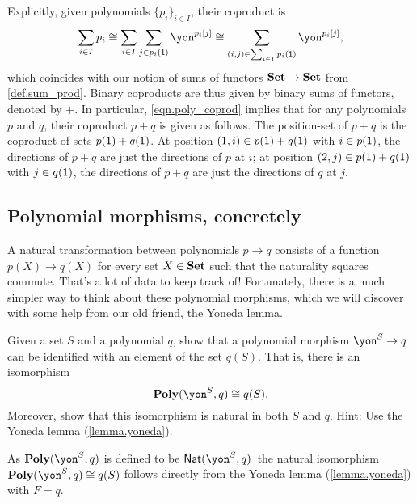 \documentclass[Book-Poly]{subfiles}
\begin{document}
Explicitly, given polynomials $\{p_i\}_{i \in I}$, their coproduct is
\begin{equation} \label{eqn.poly_coprod}
    \sum_{i \in I} p_i \iso \sum_{i \in I} \sum_{j \in p_i(\1)} \yon^{p_i[j]} \iso \sum_{(i,j) \in \sum_{i \in I} p_i(\1)} \yon^{p_i[j]},
\end{equation}
which coincides with our notion of sums of functors $\mathbf{Set} \to \mathbf{Set}$ from \cref{def.sum_prod}.
Binary coproducts are thus given by binary sums of functors, denoted by $+$.
In particular, \eqref{eqn.poly_coprod} implies that for any polynomials $p$ and $q$, their coproduct $p+q$ is given as follows.
The position-set of $p+q$ is the coproduct of sets $p(\textsf{1}) + q(\textsf{1})$.
At position $(1,i) \in p(\textsf{1}) + q(\textsf{1})$ with $i \in p(\textsf{1})$, the directions of $p+q$ are just the directions of $p$ at $i$; at position $(2,j) \in p(\textsf{1}) + q(\textsf{1})$ with $j \in q(\textsf{1})$, the directions of $p+q$ are just the directions of $q$ at $j$.

\subsection{Polynomial morphisms, concretely} \label{subsec.poly.func_nat.morph.concrete}

A natural transformation between polynomials $p \to q$ consists of a function $p(X) \to q(X)$ for every set $X \in \mathbf{Set}$ such that the naturality squares commute.
That's a lot of data to keep track of!
Fortunately, there is a much simpler way to think about these polynomial morphisms, which we will discover with some help from our old friend, the Yoneda lemma.

\begin{exercise} \label{exc.poly_morph_yoneda}
Given a set $S$ and a polynomial $q$, show that a polynomial morphism $\yon^S \to q$ can be identified with an element of the set $q(S)$.
That is, there is an isomorphism
\[
    \poly(\yon^S, q) \iso q(S).
\]
Moreover, show that this isomorphism is natural in both $S$ and $q$.
Hint: Use the Yoneda lemma (\cref{lemma.yoneda}).
\begin{solution}
As $\poly(\yon^S, q)$ is defined to be $\nat(\yon^S, q)$\, the natural isomorphism $\poly(\yon^S, q) \iso q(S)$ follows directly from the Yoneda lemma (\cref{lemma.yoneda}) with $F = q$.
\end{solution}
\end{exercise}
\end{document}
